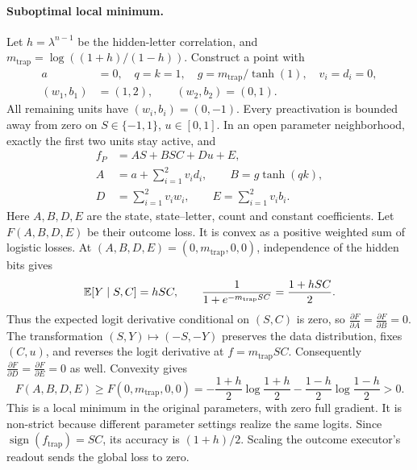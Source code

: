 \paragraph{Suboptimal local minimum.}
Let $h=\lambda^{n-1}$ be the hidden-letter correlation, and $m_{\mathrm{trap}}=\log((1+h)/(1-h))$. Construct a point with
\[
\begin{aligned}
 a&=0,\quad q=k=1,\quad g=m_{\mathrm{trap}}/\tanh(1),\quad v_i=d_i=0,\\
 (w_1,b_1)&=(1,2),\qquad (w_2,b_2)=(0,1).
\end{aligned}
\]
All remaining units have $(w_i,b_i)=(0,-1)$. Every preactivation is bounded
away from zero on $S\in\{-1,1\}$, $u\in[0,1]$. In an open parameter neighborhood,
exactly the first two units stay active, and
\[
\begin{aligned}
 f_P&=A S+B SC+D u+E,\\
 A&=a+\sum_{i=1}^2v_i d_i,\qquad B=g\tanh(qk),\\
 D&=\sum_{i=1}^2v_i w_i,\qquad E=\sum_{i=1}^2v_i b_i.
\end{aligned}
\]
Here $A,B,D,E$ are the state, state--letter, count and constant coefficients.
Let $F(A,B,D,E)$ be their outcome loss.
It is convex as a positive weighted sum of logistic losses. At
$(A,B,D,E)=(0,m_{\mathrm{trap}},0,0)$, independence of the hidden bits gives
\[
 \mathbb E[Y\mid S,C]=hSC,
 \qquad \frac{1}{1+e^{-m_{\mathrm{trap}}SC}}=\frac{1+hSC}{2}.
\]
Thus the expected logit derivative conditional on $(S,C)$ is zero, so
$\frac{\partial F}{\partial A}=\frac{\partial F}{\partial B}=0$.
The transformation $(S,Y)\mapsto(-S,-Y)$ preserves the data distribution,
fixes $(C,u)$, and reverses the logit derivative at $f=m_{\mathrm{trap}}SC$.
Consequently $\frac{\partial F}{\partial D}=\frac{\partial F}{\partial E}=0$ as well.
Convexity gives
\begin{equation}
 F(A,B,D,E)\ge F(0,m_{\mathrm{trap}},0,0)
 =-\frac{1+h}{2}\log\frac{1+h}{2}
  -\frac{1-h}{2}\log\frac{1-h}{2}>0.
 \label{eq:two-path-local-loss}
\end{equation}
This is a local minimum in the original parameters, with zero full gradient.
It is non-strict because different parameter settings realize the same logits.
Since $\operatorname{sign}(f_{\mathrm{trap}})=SC$, its accuracy is $(1+h)/2$.
Scaling the outcome executor's readout sends the global loss to zero.

